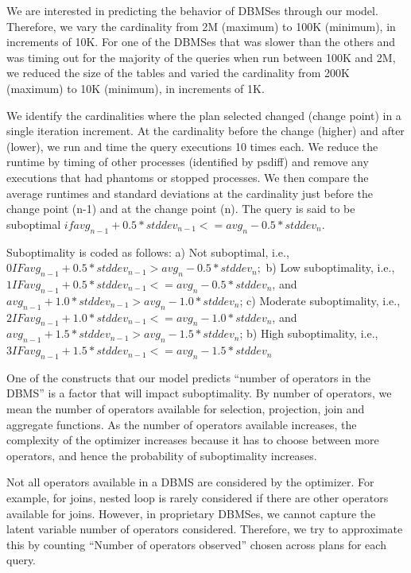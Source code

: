 We are interested in predicting the behavior of DBMSes through our
model. Therefore, we vary the cardinality from 2M (maximum) to
100K (minimum), in increments of 10K. For one of the DBMSes that was
slower than the others and was timing out for the majority of the
queries
when run between 100K and 2M, we reduced the size of the tables and
varied the cardinality from 200K (maximum) to 10K (minimum), in
increments of 1K.

We identify the cardinalities where the plan selected changed (change
point) in a single iteration increment.
At the cardinality before the change (higher) and after (lower), we
run and time the query executions 10 times each.
We reduce the runtime by timing of other processes (identified by
psdiff) and remove any executions that had phantoms or stopped processes.
We then compare the average runtimes
and standard deviations at the cardinality just before the change
point (n-1) and at the change point (n). The query is said to be suboptimal
$if avg_{n-1} + 0.5 * stddev_{n-1} <= avg_n - 0.5 * stddev_n$.

Suboptimality is coded as follows:
a) Not suboptimal, i.e., $0 IF avg_{n-1} + 0.5 * stddev_{n-1} > avg_n -
0.5 * stddev_n ;$
b) Low suboptimality, i.e., $1 IF avg_{n-1} + 0.5 * stddev_{n-1} <=
avg_n - 0.5 * stddev_n$, and
$avg_{n-1} + 1.0 * stddev_{n-1} > avg_n - 1.0 * stddev_n$;
c) Moderate suboptimality, i.e., $2 IF avg_{n-1} + 1.0 * stddev_{n-1}
<= avg_n - 1.0 * stddev_n$, and
$avg_{n-1} + 1.5 * stddev_{n-1} > avg_n - 1.5 * stddev_n$;
b) High suboptimality, i.e., $3 IF avg_{n-1} + 1.5 * stddev_{n-1} <=
avg_n - 1.5 * stddev_n$


One of the constructs that
our model predicts ``number of operators in the DBMS'' is a factor
that will impact suboptimality. By number of operators,
we mean the number of operators available for selection, projection,
join and aggregate functions. As the number
of operators available increases, the complexity of the optimizer
increases because it has to choose between more
operators, and hence the probability of suboptimality increases.

Not all operators available in a DBMS are considered by the optimizer.
For example, for joins, nested loop is rarely considered
if there are other operators available for joins. However, in
proprietary DBMSes, we cannot capture the latent variable number of
operators
considered. Therefore, we try to approximate this by counting ``Number
of operators observed'' chosen across plans for each query.

